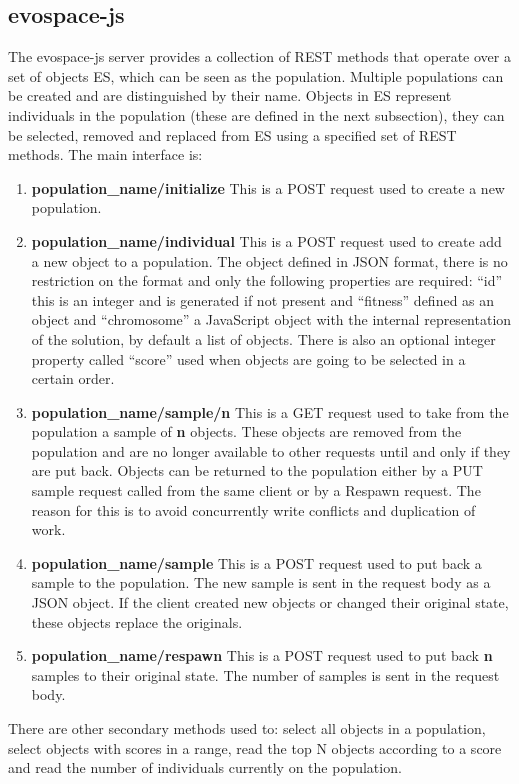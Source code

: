 \subsection{evospace-js}
 \label{sec:evospace}
The evospace-js server provides a collection of REST methods that operate over a set of objects ES, 
which can be seen as the population. Multiple populations can be created and are distinguished by their name.
Objects in ES represent individuals in the population (these are defined in the next subsection), 
they can be selected, removed and replaced from ES using a specified set of REST methods. The main
interface is:
\begin{enumerate}
    \item {\bf population\_name/initialize} 
    This is a POST request used to create a new population.
    \item {\bf population\_name/individual} 
    This is a POST request used to create add a new object
    to a population. The object defined in JSON format, there is no restriction on the format and only 
    the following properties are required: ``id'' this is an integer and is generated if not present 
    and ``fitness'' defined as an object and ``chromosome'' a JavaScript object with the internal 
    representation of the solution, by default a list of objects. 
    There is also an optional integer property called ``score'' used when objects are going to 
    be selected in a certain order.
    \item {\bf population\_name/sample/n}
    This is a GET request used to take from the population a 
    sample of {\bf n} objects. These objects are removed from the population and are no longer available
    to other requests until and only if they are put back. Objects can be returned to the population 
    either by a PUT sample request called from the same client or by a Respawn request. The reason for 
    this is to avoid concurrently write conflicts and duplication of work.
    \item {\bf population\_name/sample}
    This is a POST request used to put back a sample to the population.
    The new sample is sent in the request body as a JSON object. If the client created new objects or 
    changed their original state, these objects replace the originals. 
    \item {\bf population\_name/respawn}
    This is a POST request used to put back {\bf n} samples to their 
    original state. The number of samples is sent in the request body. 
\end{enumerate}
There are other secondary methods used to: select all objects in a population, select objects
with scores in a range, read the top N objects according to a score and read the number of
individuals currently on the population.      

